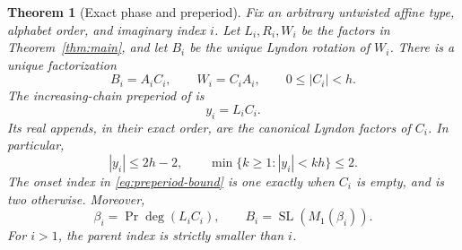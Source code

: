 \documentclass[11pt]{amsart}
\numberwithin{equation}{section}
\newtheorem{theorem}{Theorem}[section]
\theoremstyle{definition}
\DeclareMathOperator{\SL}{SL}
\DeclareMathOperator{\Prj}{Pr}
\begin{document}
\begin{theorem}[Exact phase and preperiod]\label{thm:uniform-phase}
Fix an arbitrary untwisted affine type, alphabet order, and imaginary index $i$. Let $L_i,R_i,W_i$ be the factors in Theorem~\ref{thm:main}, and let $B_i$ be the unique Lyndon rotation of $W_i$. There is a unique factorization
\begin{equation}\label{eq:phase-split}
 B_i=A_iC_i,\qquad W_i=C_iA_i,\qquad 0\leq|C_i|<h.
\end{equation}
The increasing-chain preperiod of \cite[Definition~6.10]{ETC} is
\begin{equation}\label{eq:uniform-preperiod}
 y_i=L_iC_i.
\end{equation}
Its real appends, in their exact order, are the canonical Lyndon factors of $C_i$. In particular,
\begin{equation}\label{eq:preperiod-bound}
 |y_i|\leq2h-2,\qquad
 \min\{k\geq1:|y_i|<kh\}\leq2.
\end{equation}
The onset index in \eqref{eq:preperiod-bound} is one exactly when $C_i$ is empty, and is two otherwise. Moreover,
\[
 \beta_i=\Prj\deg(L_iC_i),\qquad B_i=\SL(M_1(\beta_i)).
\]
For $i>1$, the parent index is strictly smaller than $i$.
\end{theorem}
\end{document}
